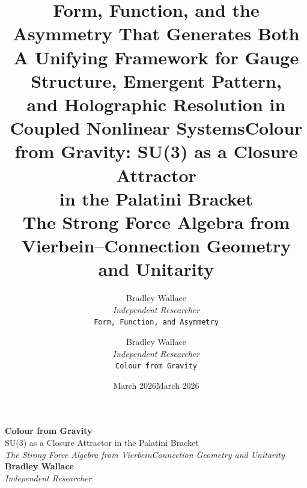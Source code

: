 \documentclass[11pt,a4paper]{article}
\title{\textbf{Form, Function, and the Asymmetry That Generates Both}\\[0.4em]
       \large A Unifying Framework for Gauge Structure, Emergent Pattern,\\
       and Holographic Resolution in Coupled Nonlinear Systems}
\author{Bradley Wallace\\[0.3em]
        \small \textit{Independent Researcher}\\[0.2em]
        \small \texttt{Form, Function, and Asymmetry}}
\date{March 2026}
\title{\textbf{Colour from Gravity: SU(3) as a Closure Attractor\\in the Palatini Bracket}\\[0.4em]
       \large The Strong Force Algebra from Vierbein--Connection Geometry and Unitarity}
\author{Bradley Wallace\\[0.3em]
        \small \textit{Independent Researcher}\\[0.2em]
        \small \texttt{Colour from Gravity}}
\date{March 2026}
\theoremstyle{plain}
\theoremstyle{definition}
\theoremstyle{remark}
\begin{document}
\begin{titlepage}
\thispagestyle{empty}

\noindent{\color{acsrule}\rule{\textwidth}{0.4pt}}
\vspace{6pt}
\vspace{6pt}
\noindent{\color{acsrule}\rule{\textwidth}{0.4pt}}

\vfill

\begin{center}
  {\Huge\bfseries\color{acsprimary} Colour from Gravity}\\[0.4em]
  {\Large\color{acsslate} SU(3) as a Closure Attractor in the Palatini Bracket}\\[1.2em]
  {\normalsize\itshape\color{acsslate}
    The Strong Force Algebra from Vierbein\textendash Connection Geometry and Unitarity}\\[2.0em]
  {\large\bfseries Bradley Wallace}\\[0.25em]
  {\small\itshape\color{acsslate} Independent Researcher}
\end{center}

\vspace{0.4in}


\end{titlepage}
\end{document}
